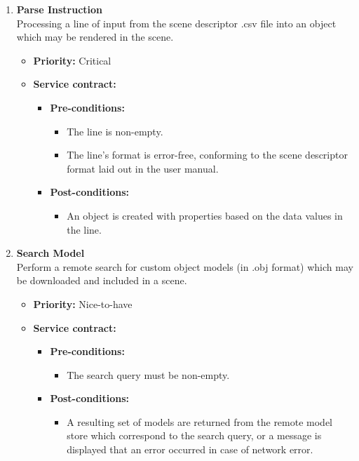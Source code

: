 \documentclass[a4paper,12pt]{article}
\begin{document}
\begin{enumerate}
			\item {\large \textbf{Parse Instruction}}\\
			Processing a line of input from the scene descriptor .csv file into an object which may be rendered in the scene.
			\begin{itemize}
				\item \textbf{Priority:} Critical
				\item \textbf{Service contract:}
				\begin{itemize}
					\item \textbf{Pre-conditions:}
						\begin{itemize}
							\item The line is non-empty.
							\item The line's format is error-free, conforming to the scene descriptor format laid out in the user manual.
						\end{itemize}
					\item \textbf{Post-conditions:}
						\begin{itemize}
							\item An object is created with properties based on the data values in the line.
						\end{itemize}
				\end{itemize}
			\end{itemize}
			
			\item {\large \textbf{Search Model}}\\
			Perform a remote search for custom object models (in .obj format) which may be downloaded and included in a scene.
			\begin{itemize}
				\item \textbf{Priority:} Nice-to-have
				\item \textbf{Service contract:}
				\begin{itemize}
					\item \textbf{Pre-conditions:}
						\begin{itemize}
							\item The search query must be non-empty.
						\end{itemize}
					\item \textbf{Post-conditions:}
						\begin{itemize}
							\item A resulting set of models are returned from the remote model store which correspond to the search query, or a message is displayed that an error occurred in case of network error.
						\end{itemize}
				\end{itemize}
			\end{itemize}
			

\end{enumerate}
\end{document}
